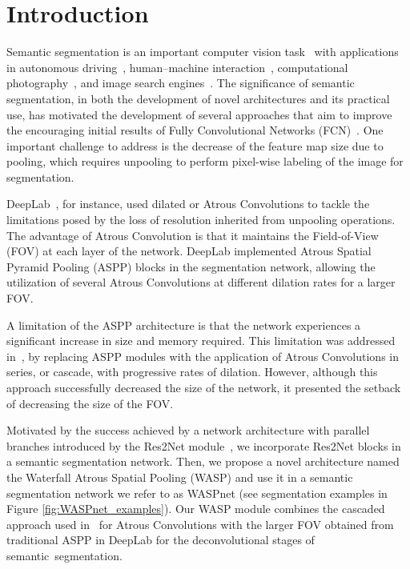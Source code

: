 \documentclass[sensors,article,accept,moreauthors,pdftex]{Definitions/mdpi}
\begin{document}
\section{Introduction}
Semantic segmentation is an important computer vision task~\cite{Review, Review2, Review3} with applications in autonomous driving~\cite{Driving}, human--machine interaction~\cite{HMI}, computational photography~\cite{photo}, and image search engines~\cite{ImageSearch}.
The significance of semantic segmentation, in both the development of novel architectures and its practical use, has motivated the development of several approaches that aim to improve the encouraging initial results of Fully Convolutional Networks (FCN)~\cite{FCN}.
One important challenge to address is the decrease of the feature map size due to pooling, which requires unpooling to perform pixel-wise labeling of the image for segmentation.

DeepLab~\cite{DeepLab}, for instance, used dilated or Atrous Convolutions to tackle the limitations posed by the loss of resolution inherited from unpooling operations. The advantage of Atrous Convolution is that it maintains the Field-of-View (FOV) at each layer of the network. DeepLab implemented Atrous Spatial Pyramid Pooling (ASPP) blocks in the segmentation network, allowing the utilization of several Atrous Convolutions at different dilation rates for a larger FOV.

A limitation of the ASPP architecture is that the network experiences a significant increase in size and memory required. This limitation was addressed in~\cite{Rethinking}, by replacing ASPP modules with the application of Atrous Convolutions in series, or cascade, with progressive rates of dilation. However, although this approach successfully decreased the size of the network, it presented the setback of decreasing the size of the FOV.

Motivated by the success achieved by a network architecture with parallel branches introduced by the Res2Net module~\cite{Res2Net}, we incorporate Res2Net blocks in a semantic segmentation network. Then, we propose a novel architecture named the Waterfall Atrous Spatial Pooling (WASP) and use it in a semantic segmentation network we refer to as WASPnet (see segmentation examples in Figure \ref{fig:WASPnet_examples}).
Our WASP module combines the cascaded approach used in~\cite{Rethinking} for Atrous Convolutions with the larger FOV obtained from traditional ASPP in DeepLab for the deconvolutional stages of semantic~segmentation.
\end{document}
